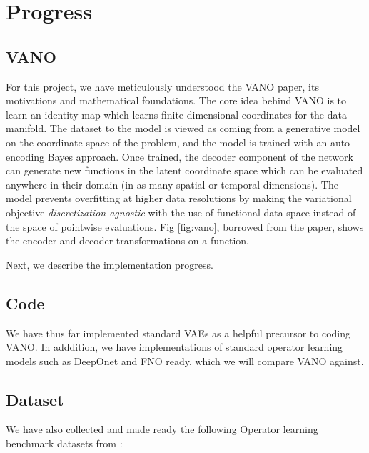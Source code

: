 \documentclass[11pt, fullpage,letterpaper]{article}
\begin{document}
\section{Progress}



\subsection{VANO}

For this project, we have meticulously understood the VANO paper, its motivations and mathematical foundations. The core idea behind VANO is to learn an identity map which learns finite dimensional coordinates for the data manifold. The dataset to the model is viewed as coming from a generative model on the coordinate space of the problem, and the model is trained with an auto-encoding Bayes approach. Once trained, the decoder component of the network can generate new functions in the latent coordinate space which can be evaluated anywhere in their domain (in as many spatial or temporal dimensions). The model prevents overfitting at higher data resolutions by making the variational objective \textit{discretization agnostic} with the use of functional data space instead of the space of pointwise evaluations. Fig \ref{fig:vano}, borrowed from the paper, shows the encoder and decoder transformations on a function.

Next, we describe the implementation progress.

\subsection{Code}

We have thus far implemented standard VAEs as a helpful precursor to coding VANO. In adddition, we have implementations of standard operator learning models such as DeepOnet and FNO ready, which we will compare VANO against. 

\subsection{Dataset}
\label{sec:dataset}

We have also collected and made ready the following Operator learning benchmark datasets from \cite{fair_paper}:
\end{document}
